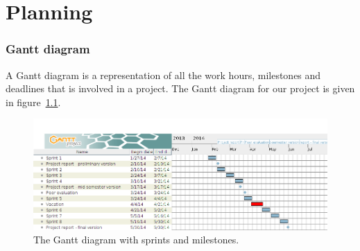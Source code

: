 \chapter{Planning}
\subsection{Gantt diagram}

A Gantt diagram is a representation of all the work hours, milestones and deadlines that is involved in a project. The Gantt diagram for our project is given in figure~\ref{fig:gantt}.

\begin{figure}[H]
\includegraphics[width=\textwidth]{ch/planning/fig/gantt.png}
\caption{The Gantt diagram with sprints and milestones.}
\label{fig:gantt}
\end{figure}



\newpage

\newpage

\newpage


